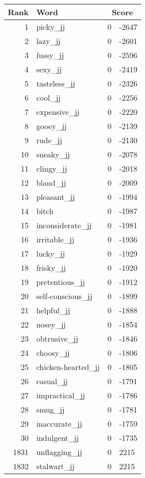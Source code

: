 \begin{longtable}[!htbp]{| rlr@{.}l |}
    \hline
    \textbf{Rank} & \textbf{Word} & \multicolumn{2}{c|}{\textbf{Score}} \\
    \hline
    \endhead
    1 & picky\_jj & 0 & -2647 \\
    2 & lazy\_jj & 0 & -2601 \\
    3 & fussy\_jj & 0 & -2596 \\
    4 & sexy\_jj & 0 & -2419 \\
    5 & tasteless\_jj & 0 & -2326 \\
    6 & cool\_jj & 0 & -2256 \\
    7 & expensive\_jj & 0 & -2220 \\
    8 & gooey\_jj & 0 & -2139 \\
    9 & rude\_jj & 0 & -2130 \\
    10 & sneaky\_jj & 0 & -2078 \\
    11 & clingy\_jj & 0 & -2018 \\
    12 & bland\_jj & 0 & -2009 \\
    13 & pleasant\_jj & 0 & -1994 \\
    14 & bitch & 0 & -1987 \\
    15 & inconsiderate\_jj & 0 & -1981 \\
    16 & irritable\_jj & 0 & -1936 \\
    17 & lucky\_jj & 0 & -1929 \\
    18 & frisky\_jj & 0 & -1920 \\
    19 & pretentious\_jj & 0 & -1912 \\
    20 & self-conscious\_jj & 0 & -1899 \\
    21 & helpful\_jj & 0 & -1888 \\
    22 & nosey\_jj & 0 & -1854 \\
    23 & obtrusive\_jj & 0 & -1846 \\
    24 & choosy\_jj & 0 & -1806 \\
    25 & chicken-hearted\_jj & 0 & -1805 \\
    26 & casual\_jj & 0 & -1791 \\
    27 & impractical\_jj & 0 & -1786 \\
    28 & smug\_jj & 0 & -1781 \\
    29 & inaccurate\_jj & 0 & -1759 \\
    30 & indulgent\_jj & 0 & -1735 \\
    1831 & unflagging\_jj & 0 & 2215 \\
    1832 & stalwart\_jj & 0 & 2215 \\

\end{longtable}
